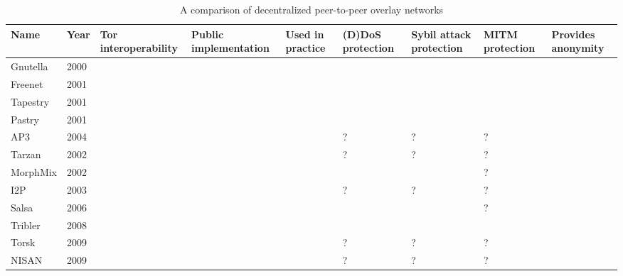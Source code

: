 \begin{center}
    \begin{longtable}{ | p{1.9cm} | p{0.8cm} | p{2.5cm} | p{2.5cm} | p{2.5cm} | p{2.5cm} | p{2.5cm} | p{2.5cm} | p{2.5cm} | }
  		\caption{A comparison of decentralized peer-to-peer overlay networks} \\ \hline
	    \textbf{Name} & \textbf{Year} & \textbf{Tor interoperability} & \textbf{Public implementation} & \textbf{Used in practice} & \textbf{(D)DoS protection} & \textbf{Sybil attack protection} & \textbf{MITM protection} & \textbf{Provides anonymity} \\ \hline
		\endfirsthead
		
		Gnutella & 2000 & \xmark & \checkmark & \checkmark & \xmark & \xmark & \xmark & \xmark \\ \hline
		Freenet & 2001 & \xmark & \checkmark & \checkmark & \checkmark & \xmark & \xmark & \checkmark \\ \hline
		Tapestry & 2001 & \xmark & \checkmark & \checkmark & \checkmark & \xmark & \xmark & \xmark \\ \hline
		Pastry & 2001 & \xmark & \checkmark & \checkmark & \checkmark & \xmark & \xmark & \xmark \\ \hline
		AP3 & 2004 & \xmark & \xmark & \xmark & ? & ? & ? & \checkmark \\ \hline
		Tarzan & 2002 & \xmark & \xmark & \xmark & ? & ? & ? & \checkmark \\ \hline
		MorphMix & 2002 & \xmark & \checkmark & \xmark & \checkmark & \xmark & ? & \checkmark \\ \hline
		I2P & 2003 & \xmark & \checkmark & \checkmark & ? & ? & ? & \checkmark\\ \hline
		Salsa & 2006 & \xmark & \xmark & \xmark & \checkmark & \checkmark & ? & \checkmark \\ \hline
		Tribler & 2008 & \xmark & \checkmark & \checkmark & \checkmark & \xmark & \xmark & \xmark \\ \hline
		Torsk & 2009 & \checkmark & \xmark & \xmark & ? & ? & ? & \checkmark \\ \hline
		NISAN & 2009 & \xmark & \xmark & \xmark & ? & ? & ? & \checkmark \\ \hline
    \end{longtable}
\end{center}